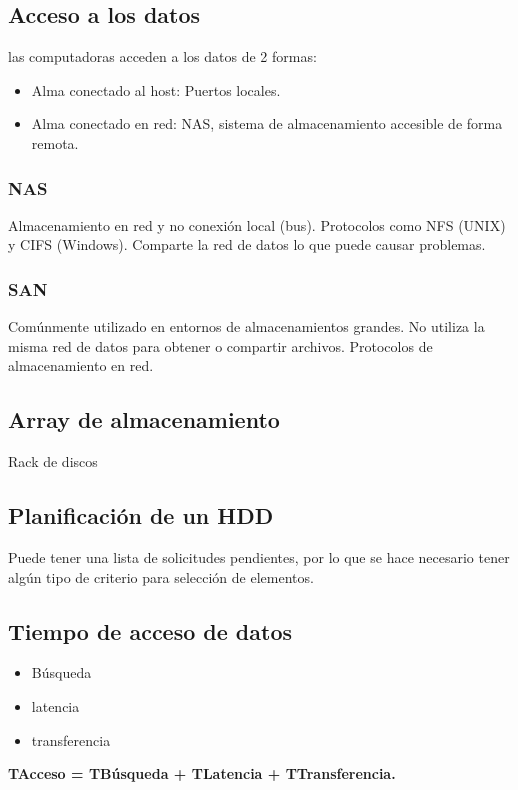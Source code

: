 \documentclass{templateNote}
\begin{document}
\subsection*{Acceso a los datos}
las computadoras acceden a los datos de 2 formas:
\begin{itemize}
    \item Alma conectado al host: Puertos locales.
    \item Alma conectado en red: NAS, sistema de almacenamiento accesible de forma remota.
\end{itemize}

\subsubsection*{NAS}
Almacenamiento en red y no conexión local (bus).
Protocolos como NFS (UNIX) y CIFS (Windows).
Comparte la red de datos lo que puede causar problemas.

\subsubsection*{SAN}
Comúnmente utilizado en entornos de almacenamientos grandes.
No utiliza la misma red de datos para obtener o compartir archivos.
Protocolos de almacenamiento en red.


\subsection*{Array de almacenamiento}
Rack de discos

\subsection*{Planificación de un HDD}
Puede tener una lista de solicitudes pendientes, por lo que se hace necesario tener algún tipo de criterio para selección de elementos.

\subsection*{Tiempo de acceso de datos}
\begin{itemize}
    Tiempo de:
    \item Búsqueda
    \item latencia
    \item transferencia
\end{itemize}
\textbf{TAcceso = TBúsqueda + TLatencia + TTransferencia.}
\end{document}
